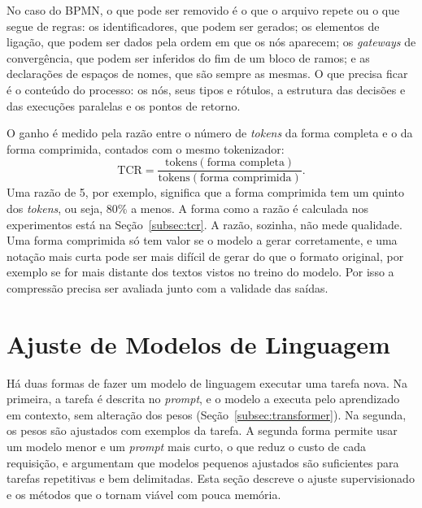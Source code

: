No caso do BPMN, o que pode ser removido é o que o arquivo repete ou o que segue de regras: os identificadores, que podem ser gerados; os elementos de ligação, que podem ser dados pela ordem em que os nós aparecem; os \textit{gateways} de convergência, que podem ser inferidos do fim de um bloco de ramos; e as declarações de espaços de nomes, que são sempre as mesmas. O que precisa ficar é o conteúdo do processo: os nós, seus tipos e rótulos, a estrutura das decisões e das execuções paralelas e os pontos de retorno.

O ganho é medido pela razão entre o número de \textit{tokens} da forma completa e o da forma comprimida, contados com o mesmo tokenizador:
\begin{equation}
	\text{TCR} = \frac{\text{tokens}(\text{forma completa})}{\text{tokens}(\text{forma comprimida})}.
\end{equation}
Uma razão de 5, por exemplo, significa que a forma comprimida tem um quinto dos \textit{tokens}, ou seja, 80\% a menos. A forma como a razão é calculada nos experimentos está na Seção~\ref{subsec:tcr}. A razão, sozinha, não mede qualidade. Uma forma comprimida só tem valor se o modelo a gerar corretamente, e uma notação mais curta pode ser mais difícil de gerar do que o formato original, por exemplo se for mais distante dos textos vistos no treino do modelo. Por isso a compressão precisa ser avaliada junto com a validade das saídas.

\section{Ajuste de Modelos de Linguagem}
\label{sec:adaptacao}\label{subsec:sft}\label{subsec:lora}

Há duas formas de fazer um modelo de linguagem executar uma tarefa nova. Na primeira, a tarefa é descrita no \textit{prompt}, e o modelo a executa pelo aprendizado em contexto, sem alteração dos pesos (Seção~\ref{subsec:transformer}). Na segunda, os pesos são ajustados com exemplos da tarefa. A segunda forma permite usar um modelo menor e um \textit{prompt} mais curto, o que reduz o custo de cada requisição, e  argumentam que modelos pequenos ajustados são suficientes para tarefas repetitivas e bem delimitadas. Esta seção descreve o ajuste supervisionado e os métodos que o tornam viável com pouca memória.

